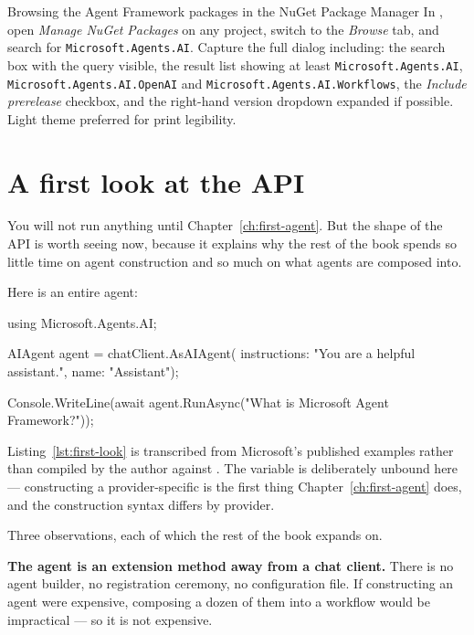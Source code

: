 %
{Browsing the Agent Framework packages in the NuGet Package Manager}%
{In \vsver{}, open \emph{Manage NuGet Packages} on any project, switch to the
\emph{Browse} tab, and search for \texttt{Microsoft.Agents.AI}. Capture the full
dialog including: the search box with the query visible, the result list showing
at least \texttt{Microsoft.Agents.AI}, \texttt{Microsoft.Agents.AI.OpenAI} and
\texttt{Microsoft.Agents.AI.Workflows}, the \emph{Include prerelease} checkbox,
and the right-hand version dropdown expanded if possible. Light theme preferred
for print legibility.}

\section{A first look at the API}

You will not run anything until Chapter~\ref{ch:first-agent}. But the shape of
the API is worth seeing now, because it explains why the rest of the book spends
so little time on agent construction and so much on what agents are composed
into.

Here is an entire agent:

\begin{csharp}[caption={An agent, in full}, label={lst:first-look}]
using Microsoft.Agents.AI;

AIAgent agent = chatClient.AsAIAgent(
    instructions: "You are a helpful assistant.",
    name: "Assistant");

Console.WriteLine(await agent.RunAsync("What is Microsoft Agent Framework?"));
\end{csharp}

\begin{verifybox}
Listing~\ref{lst:first-look} is transcribed from Microsoft's published examples
rather than compiled by the author against \mafcore{}. The 
variable is deliberately unbound here --- constructing a provider-specific
 is the first thing Chapter~\ref{ch:first-agent} does, and the
construction syntax differs by provider.
\end{verifybox}

Three observations, each of which the rest of the book expands on.

\textbf{The agent is an extension method away from a chat client.} There is no
agent builder, no registration ceremony, no configuration file. If constructing
an agent were expensive, composing a dozen of them into a workflow would be
impractical --- so it is not expensive.


